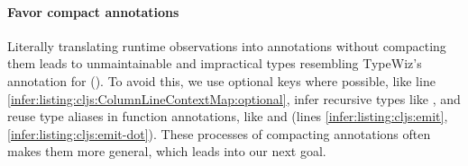\begin{figure}
\end{figure}



\paragraph{Favor compact annotations}
Literally translating runtime observations into
annotations without compacting them
leads to unmaintainable and impractical types resembling
TypeWiz's annotation for  ().
To avoid this, we
  use optional keys where possible, like line \ref{infer:listing:cljs:ColumnLineContextMap:optional},
  infer recursive types like , and
  reuse type aliases in function annotations, like
     and  (lines \ref{infer:listing:cljs:emit}, \ref{infer:listing:cljs:emit-dot}).
These processes of compacting annotations often makes them more general,
which leads into our next goal.

